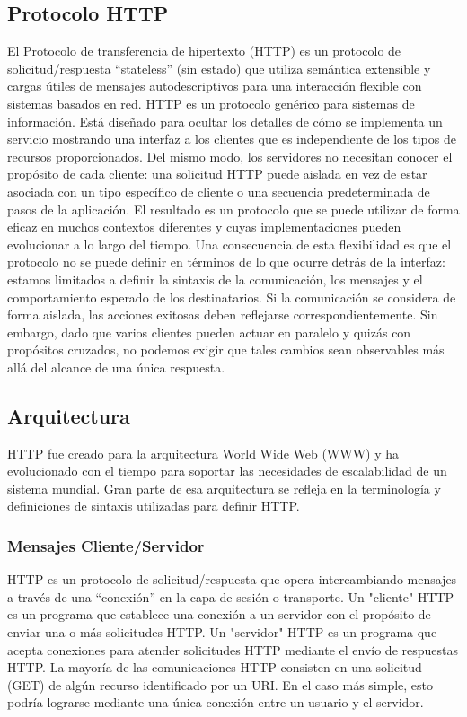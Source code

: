 \subsection{Protocolo HTTP}

El Protocolo de transferencia de hipertexto (HTTP) es un protocolo de 
solicitud/respuesta “stateless” (sin estado) que utiliza semántica 
extensible y cargas útiles de mensajes autodescriptivos para una 
interacción flexible con sistemas basados en red.
   HTTP es un protocolo genérico para sistemas de información. Está 
   diseñado para ocultar los detalles de cómo se implementa un servicio 
   mostrando una interfaz a los clientes que es independiente de los 
   tipos de recursos proporcionados. Del mismo modo, los servidores 
   no necesitan conocer el propósito de cada cliente: una solicitud 
   HTTP puede aislada en vez de estar asociada con un tipo específico
    de cliente o una secuencia predeterminada de pasos de la aplicación.
     El resultado es un protocolo que se puede utilizar de forma eficaz 
     en muchos contextos diferentes y cuyas implementaciones pueden
      evolucionar a lo largo del tiempo.
   Una consecuencia de esta flexibilidad es que el protocolo no 
   se puede definir en términos de lo que ocurre detrás de la 
   interfaz: estamos limitados a definir la sintaxis de la comunicación, 
   los mensajes y el comportamiento esperado de los destinatarios. 
   Si la comunicación se considera de forma aislada, las acciones 
   exitosas deben reflejarse correspondientemente. Sin embargo, 
   dado que varios clientes pueden actuar en paralelo y quizás con
    propósitos cruzados, no podemos exigir que tales cambios sean 
    observables más allá del alcance de una única respuesta.
   
\subsection{Arquitectura}
HTTP fue creado para la arquitectura World Wide Web (WWW) y ha 
evolucionado con el tiempo para soportar las necesidades de
 escalabilidad de un sistema mundial. Gran parte de esa arquitectura 
 se refleja en la terminología y  definiciones de sintaxis utilizadas 
 para definir HTTP.

\subsubsection*{Mensajes Cliente/Servidor}


HTTP es un protocolo de solicitud/respuesta que opera intercambiando 
mensajes a través de una ``conexión'' en la capa de sesión o transporte.
 Un "cliente" HTTP es un programa que establece una conexión a un 
 servidor con el propósito de enviar una o más solicitudes HTTP. 
 Un "servidor" HTTP es un programa que acepta conexiones para
  atender solicitudes HTTP mediante el envío de respuestas HTTP. 
  La mayoría de las comunicaciones HTTP consisten en una solicitud
   (GET) de algún recurso identificado por un URI. En el caso más 
   simple, esto podría lograrse mediante una única conexión entre un
    usuario y el servidor.

